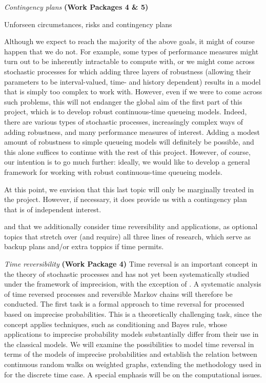 \documentclass[11pt,dvipsnames,usenames,a4paper]{article}
\begin{document}
\vspace{5pt}
\emph{Contingency plans} {\bf (Work Packages 4 \& 5)} 
\vspace{3pt}

Unforseen circumstances, risks and contingency plans

Although we expect to reach the majority of the above goals, it might of course happen that we do not. For example, some types of performance measures might turn out to be inherently intractable to compute with, or we might come across stochastic processes for which adding three layers of robustness (allowing their parameters to be interval-valued,  time- and history dependent) results in a model that is simply too complex to work with. However, even if we were to come across such problems, this will not endanger the global aim of the first part of this project, which is to develop robust continuous-time queueing models. Indeed, there are various types of stochastic processes, increasingly complex ways of adding robustness, and many performance measures of interest. Adding a modest amount of robustness to simple queueing models will definitely be possible, and this alone suffices to continue with the rest of this project. However, of course, our intention is to go much further: ideally, we would like to develop a general framework for working with robust continuous-time queueing models.

At this point, we envision that this last topic will only be marginally treated in the project. However, if necessary, it does provide us with a contingency plan that is of independent interest.


and that we additionally consider time reversibility and applications, as optional topics that stretch over (and require) all three lines of research, which serve as backup plans and/or extra toppics if time permits.

\vspace{5pt}
\emph{Time reversibility} {\bf (Work Package 4)} 
\vspace{3pt}
Time reversal is an important concept in the theory of stochastic processes and has not yet been systematically studied under the framework of imprecision, with the exception of \cite{skulj:16}. A systematic analysis of time reversed processes and reversible Markov chains will therefore be conducted. The first task is a formal approach to time reversal for processed based on imprecise probabilities. This is a theoretically challenging task, since the concept applies techniques, such as conditioning and Bayes rule, whose applications to imprecise probability models substantially differ from their use in the classical models. We will examine the possibilities to model time reversal in terms of the models of imprecise probabilities and establish the relation between continuous random walks on weighted graphs, extending the methodology used in  \cite{skulj:16} for the discrete time case. A special emphasis will be on the computational issues. 
\end{document}
